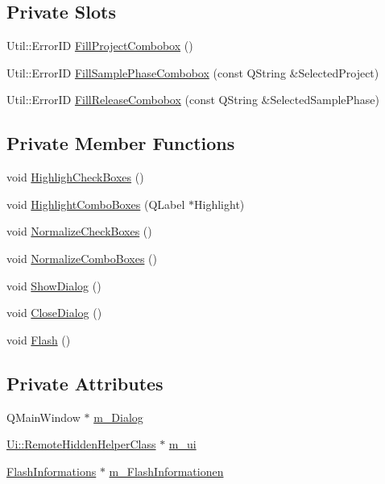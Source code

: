 \subsection*{Private Slots}
\begin{DoxyCompactItemize}
\item 
Util\+::\+Error\+ID \hyperlink{class_r_w_1_1_c_o_r_e_1_1_portal_info_af67bdf39beece4b3fb27c9f1a14ecbd7}{Fill\+Project\+Combobox} ()
\item 
Util\+::\+Error\+ID \hyperlink{class_r_w_1_1_c_o_r_e_1_1_portal_info_a3f22e04d628d3907cff56e3617dda192}{Fill\+Sample\+Phase\+Combobox} (const Q\+String \&Selected\+Project)
\item 
Util\+::\+Error\+ID \hyperlink{class_r_w_1_1_c_o_r_e_1_1_portal_info_ad9f44cdba6c3c3aa901e45d8a503c13f}{Fill\+Release\+Combobox} (const Q\+String \&Selected\+Sample\+Phase)
\end{DoxyCompactItemize}
\subsection*{Private Member Functions}
\begin{DoxyCompactItemize}
\item 
void \hyperlink{class_r_w_1_1_c_o_r_e_1_1_portal_info_aeb0d50467997e59088be9f5b952916f7}{Highligh\+Check\+Boxes} ()
\item 
void \hyperlink{class_r_w_1_1_c_o_r_e_1_1_portal_info_a9f104d772b07f236cb0f8e0c0c46461c}{Highlight\+Combo\+Boxes} (Q\+Label $\ast$Highlight)
\item 
void \hyperlink{class_r_w_1_1_c_o_r_e_1_1_portal_info_a76776e5e5e56da7ff882748881a89b65}{Normalize\+Check\+Boxes} ()
\item 
void \hyperlink{class_r_w_1_1_c_o_r_e_1_1_portal_info_a6d1f3e606e52aa278cadeb7ae8846887}{Normalize\+Combo\+Boxes} ()
\item 
void \hyperlink{class_r_w_1_1_c_o_r_e_1_1_portal_info_a8b87b8289b8d980540c3121e2e82b405}{Show\+Dialog} ()
\item 
void \hyperlink{class_r_w_1_1_c_o_r_e_1_1_portal_info_a4ecfa598aff3ba559d65dcb8a78f3715}{Close\+Dialog} ()
\item 
void \hyperlink{class_r_w_1_1_c_o_r_e_1_1_portal_info_af72c1360fe61113175d39791b18312e1}{Flash} ()
\end{DoxyCompactItemize}
\subsection*{Private Attributes}
\begin{DoxyCompactItemize}
\item 
Q\+Main\+Window $\ast$ \hyperlink{class_r_w_1_1_c_o_r_e_1_1_portal_info_ab377e834cdc7264c3d7f0d7c35c2bc6f}{m\+\_\+\+Dialog}
\item 
\hyperlink{class_ui_1_1_remote_hidden_helper_class}{Ui\+::\+Remote\+Hidden\+Helper\+Class} $\ast$ \hyperlink{class_r_w_1_1_c_o_r_e_1_1_portal_info_a8c82ce1d24c210b2e24f6844be8172ff}{m\+\_\+ui}
\item 
\hyperlink{class_r_w_1_1_c_o_r_e_1_1_flash_informations}{Flash\+Informations} $\ast$ \hyperlink{class_r_w_1_1_c_o_r_e_1_1_portal_info_a2cf39162f662b4cc27ee32edbe360907}{m\+\_\+\+Flash\+Informationen}
\end{DoxyCompactItemize}
